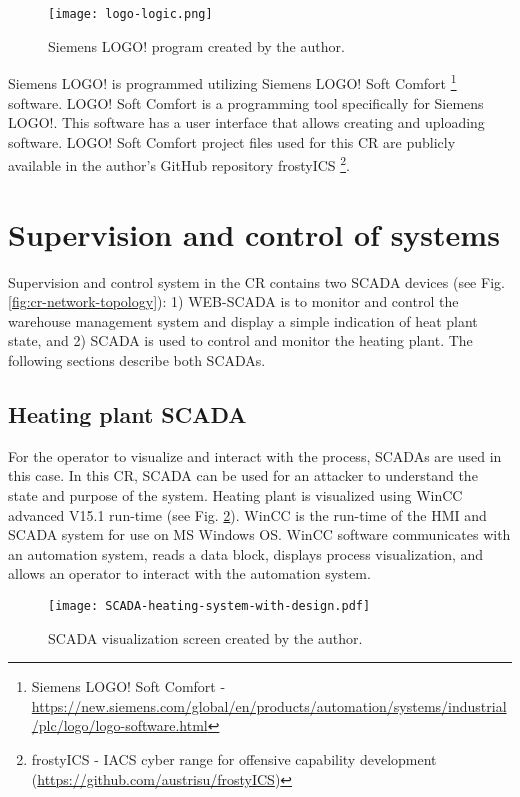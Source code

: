 \begin{figure}[htb]
	\centering
	\texttt{[image: logo-logic.png]}
	\caption{Siemens LOGO! program created by the author.}
	\label{fig:logo-logic}
\end{figure}

Siemens LOGO! is programmed utilizing Siemens LOGO! Soft Comfort \footnote{ Siemens LOGO! Soft Comfort - \url{https://new.siemens.com/global/en/products/automation/systems/industrial/plc/logo/logo-software.html}} software. LOGO! Soft Comfort is a programming tool specifically for Siemens LOGO!. This software has a user interface that allows creating and uploading software. LOGO! Soft Comfort project files used for this CR are publicly available in the author's GitHub repository frostyICS \footnote{frostyICS - IACS cyber range for offensive capability development (\url{https://github.com/austrisu/frostyICS})}.

\section{Supervision and control of systems}

Supervision and control system in the CR contains two SCADA devices (see Fig. \ref{fig:cr-network-topology}): 1) WEB-SCADA is to monitor and control the warehouse management system and display a simple indication of heat plant state, and 2) SCADA is used to control and monitor the heating plant. The following sections describe both SCADAs.

\subsection{Heating plant SCADA}

For the operator to visualize and interact with the process, SCADAs are used in this case. In this CR, SCADA can be used for an attacker to understand the state and purpose of the system. Heating plant is visualized using WinCC advanced V15.1 run-time (see Fig. \ref{fig:scada-programing-interface}). WinCC is the run-time of the HMI and SCADA system for use on MS Windows OS. WinCC software communicates with an automation system, reads a data block, displays process visualization, and allows an operator to interact with the automation system. 

\begin{figure}[h]
	\centering
	\texttt{[image: SCADA-heating-system-with-design.pdf]}
	\caption{SCADA visualization screen created by the author.}
	\label{fig:scada-programing-interface}
\end{figure} 


